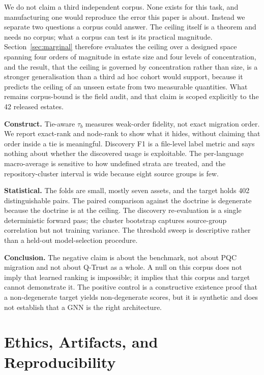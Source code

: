 \documentclass[journal,10pt]{IEEEtran}
\newcommand{\tb}{\tau_b}
\begin{document}
We do not claim a third independent corpus. None exists for this task, and manufacturing one would
reproduce the error this paper is about. Instead we separate two questions a corpus could answer.
The ceiling itself is a theorem and needs no corpus; what a corpus can test is its practical
magnitude. Section~\ref{sec:marginal} therefore evaluates the ceiling over a designed space spanning
four orders of magnitude in estate size and four levels of concentration, and the result, that the
ceiling is governed by concentration rather than size, is a stronger generalisation than a third ad
hoc cohort would support, because it predicts the ceiling of an unseen estate from two measurable
quantities. What remains corpus-bound is the field audit, and that claim is scoped explicitly to the
42 released estates.

\textbf{Construct.} Tie-aware $\tb$ measures weak-order fidelity, not exact migration order. We
report exact-rank and node-rank to show what it hides, without claiming that order inside a tie is
meaningful. Discovery F1 is a file-level label metric and says nothing about whether the discovered
usage is exploitable. The per-language macro-average is sensitive to how undefined strata are
treated, and the repository-cluster interval is wide because eight source groups is few.

\textbf{Statistical.} The folds are small, mostly seven assets, and the target holds 402
distinguishable pairs. The paired comparison against the doctrine is degenerate because the doctrine
is at the ceiling. The discovery re-evaluation is a single deterministic forward pass; the cluster
bootstrap captures source-group correlation but not training variance. The threshold sweep is
descriptive rather than a held-out model-selection procedure.

\textbf{Conclusion.} The negative claim is about the benchmark, not about PQC migration and not
about Q-Trust as a whole. A null on this corpus does not imply that learned ranking is impossible;
it implies that this corpus and target cannot demonstrate it. The positive control is a constructive
existence proof that a non-degenerate target yields non-degenerate scores, but it is synthetic and
does not establish that a GNN is the right architecture.

\section{Ethics, Artifacts, and Reproducibility}
\label{sec:artifacts}
\end{document}

